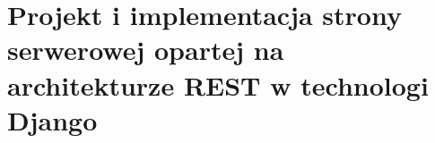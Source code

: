 
\chapter{Projekt i implementacja strony serwerowej opartej na architekturze REST w technologi Django}

